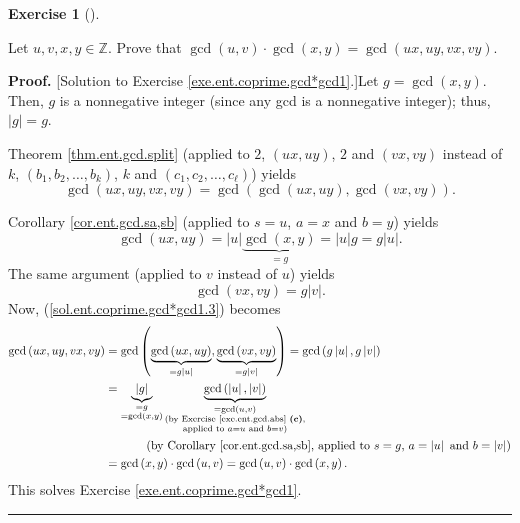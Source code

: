\documentclass[numbers=enddot,12pt,final,onecolumn,notitlepage]{scrartcl}%
\newcounter{exer}
\numberwithin{exer}{subsection}
\theoremstyle{definition}
\newtheorem{exmp}[exer]{Exercise}
\newenvironment{exercise}[1][]
{\begin{exmp}[#1]\begin{leftbar}}
{\end{leftbar}\end{exmp}}
\newenvironment{fineprint}{\begin{small}}{\end{small}}
\newenvironment{proof}[1][Proof]{\noindent\textbf{#1.} }{\ \rule{0.5em}{0.5em}}
\begin{document}
\begin{exercise}
\label{exe.ent.coprime.gcd*gcd1}Let $u,v,x,y\in\mathbb{Z}$. Prove that
$\gcd\left(  u,v\right)  \cdot\gcd\left(  x,y\right)  =\gcd\left(
ux,uy,vx,vy\right)  $.
\end{exercise}

\begin{fineprint}
\begin{proof}
[Solution to Exercise \ref{exe.ent.coprime.gcd*gcd1}.]Let $g=\gcd\left(
x,y\right)  $. Then, $g$ is a nonnegative integer (since any gcd is a
nonnegative integer); thus, $\left\vert g\right\vert =g$.

Theorem \ref{thm.ent.gcd.split} (applied to $2$, $\left(  ux,uy\right)  $, $2$
and $\left(  vx,vy\right)  $ instead of $k$, $\left(  b_{1},b_{2},\ldots
,b_{k}\right)  $, $k$ and $\left(  c_{1},c_{2},\ldots,c_{\ell}\right)  $)
yields
\begin{equation}
\gcd\left(  ux,uy,vx,vy\right)  =\gcd\left(  \gcd\left(  ux,uy\right)
,\gcd\left(  vx,vy\right)  \right)  . \label{sol.ent.coprime.gcd*gcd1.3}%
\end{equation}


Corollary \ref{cor.ent.gcd.sa,sb} (applied to $s=u$, $a=x$ and $b=y$) yields%
\[
\gcd\left(  ux,uy\right)  =\left\vert u\right\vert \underbrace{\gcd\left(
x,y\right)  }_{=g}=\left\vert u\right\vert g=g\left\vert u\right\vert .
\]
The same argument (applied to $v$ instead of $u$) yields%
\[
\gcd\left(  vx,vy\right)  =g\left\vert v\right\vert .
\]
Now, (\ref{sol.ent.coprime.gcd*gcd1.3}) becomes%
\begin{align*}
\gcd\left(  ux,uy,vx,vy\right)   &  =\gcd\left(  \underbrace{\gcd\left(
ux,uy\right)  }_{=g\left\vert u\right\vert },\underbrace{\gcd\left(
vx,vy\right)  }_{=g\left\vert v\right\vert }\right)  =\gcd\left(  g\left\vert
u\right\vert ,g\left\vert v\right\vert \right) \\
&  =\underbrace{\left\vert g\right\vert }_{\substack{=g\\=\gcd\left(
x,y\right)  }}\underbrace{\gcd\left(  \left\vert u\right\vert ,\left\vert
v\right\vert \right)  }_{\substack{=\gcd\left(  u,v\right)  \\\text{(by
Exercise \ref{exe.ent.gcd.abs} \textbf{(c)},}\\\text{applied to }a=u\text{ and
}b=v\text{)}}}\\
&  \ \ \ \ \ \ \ \ \ \ \left(  \text{by Corollary \ref{cor.ent.gcd.sa,sb},
applied to }s=g\text{, }a=\left\vert u\right\vert \text{ and }b=\left\vert
v\right\vert \right) \\
&  =\gcd\left(  x,y\right)  \cdot\gcd\left(  u,v\right)  =\gcd\left(
u,v\right)  \cdot\gcd\left(  x,y\right)  .
\end{align*}
This solves Exercise \ref{exe.ent.coprime.gcd*gcd1}.
\end{proof}
\end{fineprint}
\end{document}
